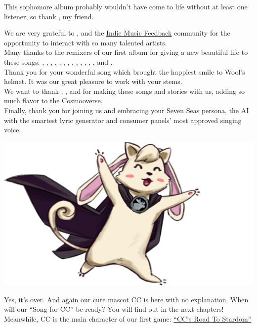 

This sophomore album probably wouldn't have come to life without at least one listener, so thank , my friend.

We are very grateful to ,  and the \href{https://indiemusicfeedback.com}{Indie Music Feedback} community for the opportunity to interact with so many talented artists.\\
Many thanks to the remixers of our first album for giving a new beautiful life to these songs: , , , , , , , , , , , , , and . \\
Thank you  for your wonderful song which brought the happiest smile to Wool's helmet. It was our great pleasure to work with your stems.\\
We want to thank , , and  for making these songs and stories with us, adding so much flavor to the Cosmooverse. \\
Finally, thank you  for joining us and embracing your Seven Seas persona, the AI with the smartest lyric generator and consumer panels' most approved singing voice.

\clearpage

\begin{center}
    \includegraphics[height=0.3\textheight]{Assets/cccape}
\end{center}

Yes, it's over. And again our cute mascot CC is here with no explanation. When will our ``Song for CC'' be ready? You will find out in the next chapters!\\
Meanwhile, CC is the main character of our first game: \href{https://okfeather.itch.io/ccs-road-to-stardom}{``CC's Road To Stardom''}

